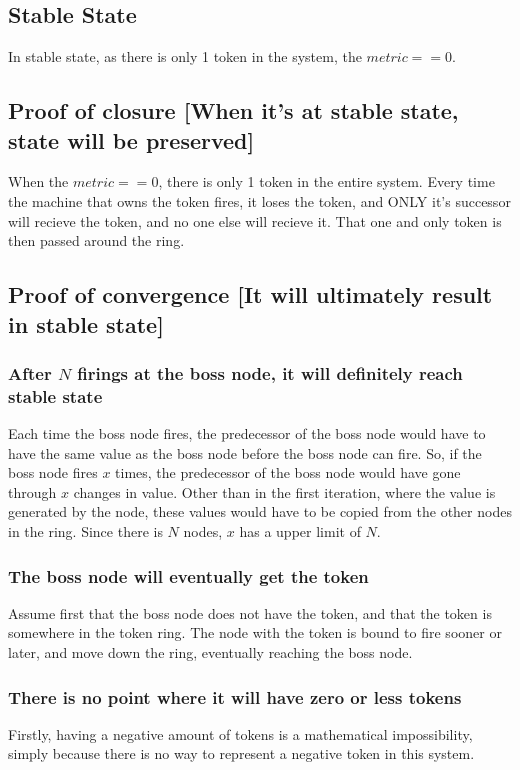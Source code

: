 \documentclass[]{article}
\begin{document}
\subsection{Stable State}
In stable state, as there is only 1 token in the system, the $metric == 0$.\\

\subsection{Proof of closure [When it's at stable state, state will be preserved]}
When the $metric == 0$, there is only 1 token in the entire system. Every time the machine that owns the token fires, it loses the token, and ONLY it's successor will recieve the token, and no one else will recieve it. That one and only token is then passed around the ring.\\

\subsection{Proof of convergence [It will ultimately result in stable state]}
\subsubsection{After $N$ firings at the boss node, it will definitely reach stable state}
Each time the boss node fires, the predecessor of the boss node would have to have the same value as the boss node before the boss node can fire. So, if the boss node fires $x$ times, the predecessor of the boss node would have gone through $x$ changes in value. Other than in the first iteration, where the value is generated by the node, these values would have to be copied from the other nodes in the ring. Since there is $N$ nodes, $x$ has a upper limit of $N$.\\

\subsubsection{The boss node will eventually get the token}
Assume first that the boss node does not have the token, and that the token is somewhere in the token ring. The node with the token is bound to fire sooner or later, and move down the ring, eventually reaching the boss node.\\

\subsubsection{There is no point where it will have zero or less tokens}
Firstly, having a negative amount of tokens is a mathematical impossibility, simply because there is no way to represent a negative token in this system.\\
\end{document}
